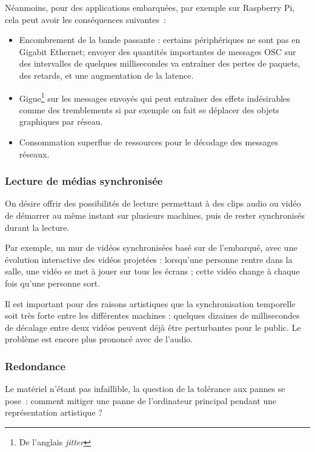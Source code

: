 \documentclass[10pt]{article}
\begin{document}
Néanmoins, pour des applications embarquées, par exemple sur Raspberry Pi, cela peut avoir les conséquences suivantes~: 
\begin{itemize}
    \item Encombrement de la bande passante : certains périphériques ne sont pas en Gigabit Ethernet; envoyer des quantités importantes de messages OSC sur des intervalles de quelques millisecondes va entraîner des pertes de paquets, des retards, et une augmentation de la latence.
    \item Gigue\footnote{De l'anglais \textit{jitter}} sur les messages envoyés qui peut entraîner des effets indésirables comme des tremblements si par exemple on fait se déplacer des objets graphiques par réseau.
    \item Consommation superflue de ressources pour le décodage des messages réseaux.
\end{itemize}


\subsubsection{Lecture de médias synchronisée}
On désire offrir des possibilités de lecture permettant à 
des clips audio ou vidéo de démarrer au même instant sur plusieurs machines, 
puis de rester synchronisés durant la lecture.

Par exemple, un mur de vidéos synchronisées basé sur de l'embarqué, avec 
une évolution interactive des vidéos projetées : lorsqu'une personne rentre dans la salle, une vidéo se met à jouer sur tous les écrans ; cette vidéo change à chaque fois qu'une personne sort.

Il est important pour des raisons artistiques que la synchronisation temporelle soit très forte entre les différentes machines : quelques dizaines de millisecondes de décalage entre deux vidéos peuvent déjà être perturbantes pour le public. 
Le problème est encore plus prononcé avec de l'audio.

\subsubsection{Redondance}
Le matériel n'étant pas infaillible, la question de la tolérance aux pannes se pose~: comment mitiger une panne de l'ordinateur principal pendant une représentation artistique ?
\end{document}
